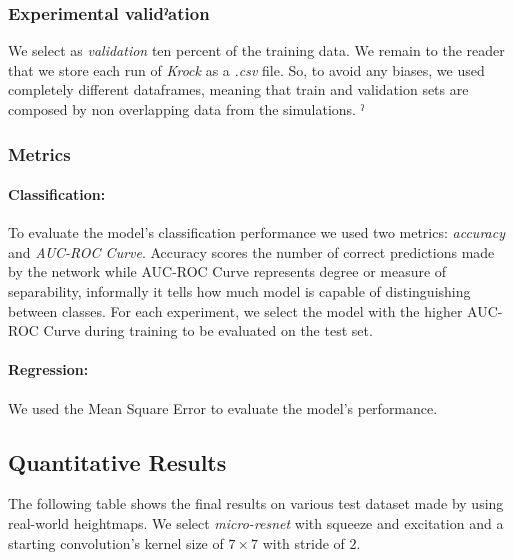 \documentclass[../document.tex]{subfiles}
\begin{document}
\subsubsection{Experimental validˀation}
We select as \emph{validation} ten percent of the training data. We remain to the reader that we store each run of \emph{Krock} as a \emph{.csv} file. So, to avoid any biases, we used completely different dataframes, meaning that train and validation sets are composed by non overlapping data from the simulations.
ˀ
\subsubsection{Metrics}

\paragraph{Classification:} To evaluate the model's classification performance we used two metrics: \emph{accuracy} and \emph{AUC-ROC Curve}. Accuracy scores the number of correct predictions made by the network while AUC-ROC Curve represents degree or measure of separability, informally it tells how much model is capable of distinguishing between classes. For each experiment, we select the model with the higher AUC-ROC Curve during training to be evaluated on the test set.
\paragraph{Regression:} We used the Mean Square Error to evaluate the model's performance.
\subsection{Quantitative Results}
The following table shows the final results on various test dataset made by using real-world heightmaps. We select \emph{micro-resnet}
with squeeze and excitation and a starting convolution's kernel size of $7\times7$ with stride of $2$.
\end{document}
